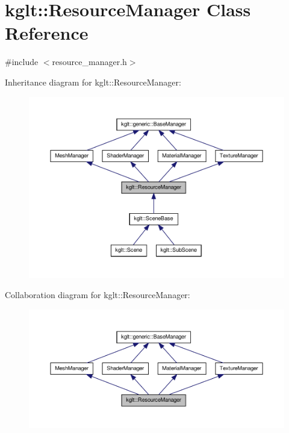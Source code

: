 \hypertarget{classkglt_1_1_resource_manager}{\section{kglt\-:\-:Resource\-Manager Class Reference}
\label{classkglt_1_1_resource_manager}
}


{\ttfamily \#include $<$resource\-\_\-manager.\-h$>$}



Inheritance diagram for kglt\-:\-:Resource\-Manager\-:\nopagebreak
\begin{figure}[H]
\begin{center}
\leavevmode
\includegraphics[width=350pt]{classkglt_1_1_resource_manager__inherit__graph}
\end{center}
\end{figure}


Collaboration diagram for kglt\-:\-:Resource\-Manager\-:\nopagebreak
\begin{figure}[H]
\begin{center}
\leavevmode
\includegraphics[width=350pt]{classkglt_1_1_resource_manager__coll__graph}
\end{center}
\end{figure}
